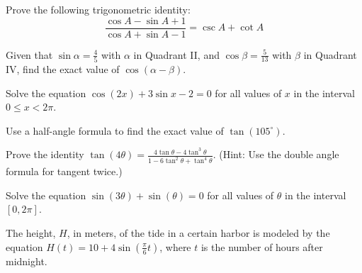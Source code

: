 \documentclass[12pt]{exam}
\begin{document}
\begin{questions}
\question[10]
Prove the following trigonometric identity:
\[ \frac{\cos A - \sin A + 1}{\cos A + \sin A - 1} = \csc A + \cot A \]
\vspace*{6cm}

\newpage

\question[10]
Given that $\sin \alpha = \frac{4}{5}$ with $\alpha$ in Quadrant II, and $\cos \beta = \frac{5}{13}$ with $\beta$ in Quadrant IV, find the exact value of $\cos(\alpha - \beta)$.
\vspace*{5cm}

\question[10]
Solve the equation $\cos(2x) + 3\sin x - 2 = 0$ for all values of $x$ in the interval $0 \le x < 2\pi$.
\vspace*{5cm}

\newpage

\question[10]
Use a half-angle formula to find the exact value of $\tan(105^\circ)$.
\vspace*{5cm}

\question[10]
Prove the identity $\tan(4\theta) = \frac{4\tan\theta - 4\tan^3\theta}{1 - 6\tan^2\theta + \tan^4\theta}$. (Hint: Use the double angle formula for tangent twice.)
\vspace*{7cm}

\newpage

\question[10]
Solve the equation $\sin(3\theta) + \sin(\theta) = 0$ for all values of $\theta$ in the interval $[0, 2\pi]$.
\vspace*{5cm}

\question[10]
The height, $H$, in meters, of the tide in a certain harbor is modeled by the equation $H(t) = 10 + 4\sin(\frac{\pi}{6}t)$, where $t$ is the number of hours after midnight.


\end{questions}
\end{document}
